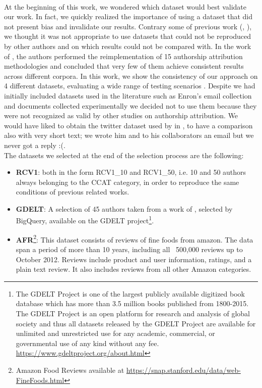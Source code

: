 \paragraph{}
At the beginning of this work, we wondered which dataset would best validate our work. In fact, we quickly realized the importance of using a dataset that did not present bias and invalidate our results. Contrary some of previous work (\cite{diederich2003authorship}, \cite{koppel2003exploiting}), we thought it was not appropriate to use datasets that could not be reproduced by other authors and on which results could not be compared with.
In the work of \citeauthor{potthast2016wrote} \cite{potthast2016wrote},
the authors performed the reimplementation of 15 authorship attribution methodologies and concluded that very few of them achieve consistent results across different corpora. In
this work, we show the consistency of our approach on 4 different datasets, evaluating a wide range of testing scenarios \cite{posadas2017application}.
Despite we had initially included datasets used in the literature such as Enron's email collection and documents collected experimentally we decided not to use them because they were not recognized as valid by other studies on authorship attribution.
We would have liked to obtain the twitter dataset used by \citeauthor{layton2010authorship} in \cite{layton2010authorship}, to have a comparison also with very short text; we wrote him and to his collaborators an email but we never got a reply :(.\\
The datasets we selected at the end of the selection process are the following:
\begin{itemize}
\item \textbf{RCV1}: both in the form RCV1\_10 and RCV1\_50, i.e. 10 and 50 authors always belonging to the CCAT category, in order to reproduce the same conditions of previous related works.
\item \textbf{GDELT}: A selection of 45 authors taken from a work of \cite{gungor2018benchmarking}, selected by BigQuery, available on the GDELT project\footnote{The GDELT Project is one of the largest publicly available digitized book database which
	has more than 3.5 million books published from 1800-2015. The GDELT Project is an
	open platform for research and analysis of global society and thus all datasets released by
	the GDELT Project are available for unlimited and unrestricted use for any academic,
	commercial, or governmental use of any kind without any fee. \url{https://www.gdeltproject.org/about.html}}.
\item \textbf{AFR}\footnote{Amazon Food Reviews available at \url{https://snap.stanford.edu/data/web-FineFoods.html}}: This dataset consists of reviews of fine foods from amazon. The data span a period of more than 10 years, including all ~500,000 reviews up to October 2012. Reviews include product and user information, ratings, and a plain text review. It also includes reviews from all other Amazon categories.
\end{itemize}
